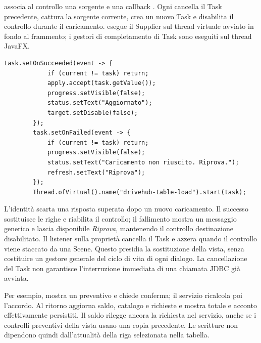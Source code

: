  associa al controllo una sorgente  e una
callback . Ogni  cancella il Task precedente,
cattura la sorgente corrente, crea un nuovo Task e disabilita il controllo
durante il caricamento.  esegue il Supplier sul thread virtuale
avviato in fondo al frammento; i gestori di completamento di Task sono
eseguiti sul thread JavaFX.

\noindent\begin{minipage}{\linewidth}
\begin{lstlisting}[firstnumber=60,caption={\code{AsyncLoad.java}: pubblicazione del risultato corrente e stato di errore.},
  label=lst:async]
        task.setOnSucceeded(event -> {
            if (current != task) return;
            apply.accept(task.getValue());
            progress.setVisible(false);
            status.setText("Aggiornato");
            target.setDisable(false);
        });
        task.setOnFailed(event -> {
            if (current != task) return;
            progress.setVisible(false);
            status.setText("Caricamento non riuscito. Riprova.");
            refresh.setText("Riprova");
        });
        Thread.ofVirtual().name("drivehub-table-load").start(task);
\end{lstlisting}
\end{minipage}


L'identità  scarta una risposta superata dopo un
nuovo caricamento. Il successo sostituisce le righe e riabilita il
controllo; il fallimento mostra un messaggio generico e lascia disponibile
\emph{Riprova}, mantenendo il controllo destinazione disabilitato.
Il listener sulla proprietà  cancella il Task e azzera
 quando il controllo viene staccato da una Scene.
Questo presidia la sostituzione della vista, senza costituire un gestore
generale del ciclo di vita di ogni dialogo. La cancellazione del Task
non garantisce l'interruzione immediata di una chiamata JDBC già avviata.

Per esempio,  mostra un preventivo e chiede
conferma; il servizio ricalcola poi l'accordo. Al ritorno aggiorna saldo,
catalogo e richieste e mostra totale e acconto effettivamente persistiti.
Il saldo rilegge ancora la richiesta nel servizio, anche se i controlli
preventivi della vista usano una copia precedente. Le scritture non
dipendono quindi dall'attualità della riga selezionata nella tabella.

